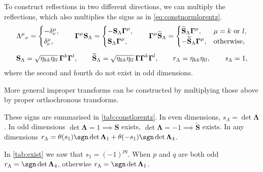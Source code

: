 \documentclass[11pt]{article}
\newcommand{\Gammab}{\boldsymbol{\Gamma}}
\renewcommand{\S}{\mathbf{S}}
\newcommand{\St}{\widetilde{\S}}
\newcommand{\Lambdab}{\boldsymbol{\Lambda}}
\begin{document}
To construct reflections in two different directions, we can multiply the reflections, which also multiplies the signs as in \cref{eq:constnormlorentz}.
%
\begin{gather}
  \Lambda^\mu{}_\nu 
    = \begin{cases}
        -\delta^\mu_\nu, \\
        \delta^\mu_\nu,
      \end{cases}
  \quad
  \Gammab^\mu \S_\Lambda
  = \begin{cases}
    -\S_\Lambda \Gammab^\mu, \\
    \S_\Lambda \Gammab^\mu,
  \end{cases}
  \quad
  \Gammab^\mu \St_\Lambda
  = \begin{cases}
    \St_\Lambda \Gammab^\mu, & \mu = k \text{ or } l, \\
    -\St_\Lambda \Gammab^\mu, & \text{otherwise},
  \end{cases}
  \notag \\[0.5em] \label{eq:reflect2}
  \S_\Lambda = \sqrt{\eta_{kk}\eta_{ll}}\, \Gammab^k \Gammab^l, \qquad
  \St_\Lambda = \sqrt{\eta_{kk}\eta_{ll}}\, \Gammab \Gammab^k \Gammab^l, \qquad
  r_\Lambda = \eta_{kk} \eta_{ll}, \qquad
  s_\Lambda = 1, 
\end{gather}
%
where the second and fourth do not exist in odd dimensions.

More general improper transforms can be constructed by multiplying those above by proper orthochronous transforms.

These signs are summarised in \cref{tab:constlorentz}.
In even dimensions, \(s_\Lambda = \det \Lambdab\). 
In odd dimensions \(\det \Lambdab = 1 \implies \S\) exists, \(\det \Lambdab = -1 \implies \St\) exists.
In any dimensions \(r_\Lambda = \theta(s_1) \sgn \det \Lambdab_1 + \theta(-s_1) \sgn \det \Lambdab_4\).

In \cref{tab:exist} we saw that \(s_1 = (-1)^{pq}\).
When \(p\) and \(q\) are both odd \(r_\Lambda = \sgn \det \Lambdab_4\), 
otherwise \(r_\Lambda = \sgn \det \Lambdab_1\).
\end{document}
